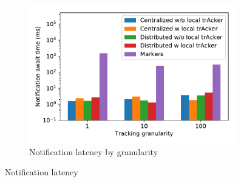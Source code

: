 \begin{figure}[t!]
\begin{subfigure}[b]{0.32\textwidth}
            \includegraphics[width=0.99\textwidth]{pics/notification_await_time_by_tracking_frequency_bars.pdf}
            \caption{Notification latency by granularity}
            \label{notification_granularity}
	\end{subfigure}
    \caption{Notification latency}
    \label{notification_latency}
\end{figure}

